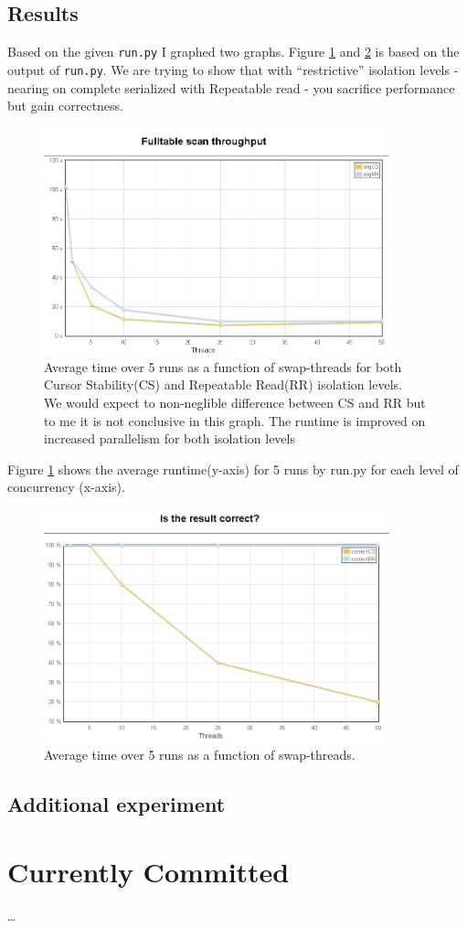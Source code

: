 \section{Results}
Based on the given \verb|run.py| I graphed two graphs. Figure
\ref{fig:origtime} and \ref{fig:origcorrect} is based on the output of
\verb|run.py|. We are trying to show that with ``restrictive'' isolation levels
- nearing on complete serialized with Repeatable read - you sacrifice
performance but gain correctness.
\begin{figure}
  \centering
  \includegraphics[width=10cm]{origtime}
  \caption[Average time over 5 runs]{Average time over 5 runs as a function of
  swap-threads for both Cursor Stability(CS) and Repeatable Read(RR) isolation levels.\\
  We would expect to non-neglible difference between CS and RR but to me it is
  not conclusive in this graph. The runtime is improved on increased parallelism
  for both isolation levels}\label{fig:origtime}
\end{figure}

Figure \ref{fig:origtime} shows the average runtime(y-axis) for 5 runs by run.py for
each level of concurrency (x-axis).

\begin{figure}
  \centering
  \includegraphics[width=10cm]{origcorrect}
  \caption{Average time over 5 runs as a function of swap-threads.}\label{fig:origcorrect}
\end{figure}

\section{Additional experiment}\label{sec:add}



\chapter{Currently Committed}\label{sec:curcommit}
\ldots



